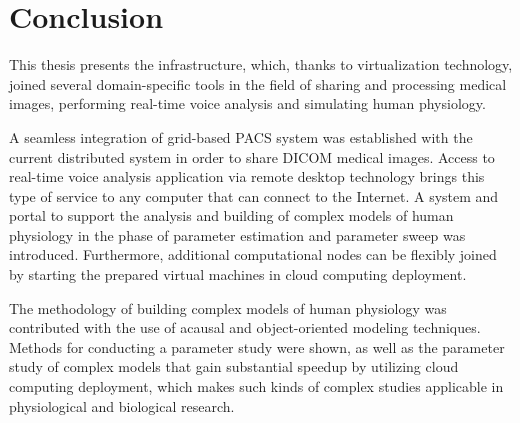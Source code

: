 \chapter{Conclusion}
\label{sec:conclusion}

This thesis presents the infrastructure, which, thanks to virtualization technology, joined several domain-specific tools in the field of sharing and processing medical images, performing real-time voice analysis and simulating human physiology.  

A seamless integration of grid-based PACS system was established with the current distributed system in order to share DICOM medical images. Access to real-time voice analysis application via remote desktop technology brings this type of service to any computer that can connect to the Internet. A system and portal to support the analysis and building of complex models of human physiology in the phase of parameter estimation and parameter sweep was introduced. Furthermore, additional computational nodes can be flexibly joined by starting the prepared virtual machines in cloud computing deployment. 

The methodology of building complex models of human physiology was contributed with the use of acausal and object-oriented modeling techniques. Methods for conducting a parameter study were shown, as well as the parameter study of complex models that gain substantial speedup by utilizing cloud computing deployment, which makes such kinds of complex studies applicable in physiological and biological research.

